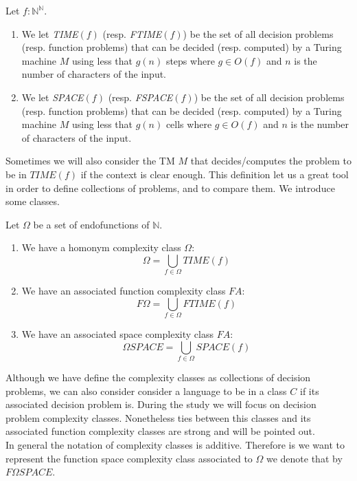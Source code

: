 \begin{definition}
  Let $f:\mathbb{N}^\mathbb{N}$.
\begin{enumerate}
  \item We let \emph{TIME}$(f)$ (resp. \emph{FTIME}$(f)$) be the set of all decision  problems (resp. function problems) that can be decided (resp. computed) by a Turing machine $M$ using less that $g(n)$ steps where $g\in O(f)$ and $n$ is the number of characters of the input.  
  \item We let \emph{SPACE}$(f)$ (resp. \emph{FSPACE}$(f)$) be the set of all decision problems (resp. function problems) that can be decided (resp. computed) by a Turing machine $M$ using less that $g(n)$ cells where $g\in O(f)$ and $n$ is the number of characters of the input.  
  \end{enumerate}

\end{definition}

Sometimes we will also consider the TM $M$ that decides/computes the problem to be in $TIME(f)$ if the context is clear enough. This definition let us a great tool in order to define collections of problems, and to compare them. We introduce some classes.
\begin{definition}
  Let $\Omega$ be a set of endofunctions of $\mathbb{N}$.
  \begin{enumerate}
  \item We have a homonym complexity class $\Omega$:
  $$\Omega =  \bigcup_{f \in \Omega} TIME(f) $$
  \item We have an associated function complexity class $FA$:
    $$F\Omega =  \bigcup_{f \in \Omega} FTIME(f)$$
  \item We have an associated space complexity class $FA$:
    $$\Omega SPACE =  \bigcup_{f \in \Omega} SPACE(f)$$  \end{enumerate}
\end{definition}


Although we have define the complexity classes as collections of decision problems, we can also consider consider a language to be in a class $C$ if its associated decision problem is. During the study we will focus on decision problem complexity classes. Nonetheless ties between this classes and its associated function complexity classes are strong and will be pointed out.\\

In general the notation of complexity classes is additive. Therefore is we want to represent the function space complexity class associated to $\Omega$ we denote that by $F\Omega SPACE$.\\


